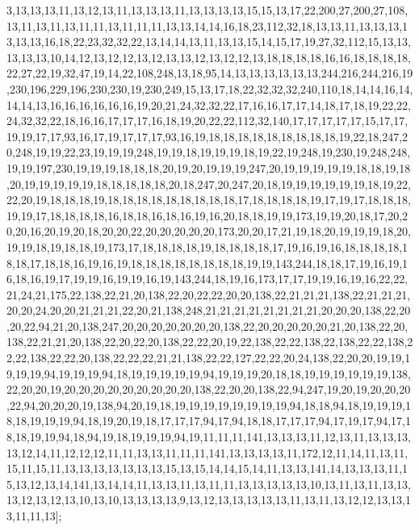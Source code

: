 3,13,13,13,11,13,12,13,11,13,13,13,11,13,13,13,13,15,15,13,17,22,200,27,200,27,108,13,11,13,11,13,11,11,13,11,11,11,13,13,14,14,16,18,23,112,32,18,13,13,11,13,13,13,13,13,13,16,18,22,23,32,32,22,13,14,14,13,11,13,13,15,14,15,17,19,27,32,112,15,13,13,13,13,13,10,14,12,13,12,12,13,12,13,13,12,13,12,12,13,18,18,18,18,16,16,18,18,18,18,22,27,22,19,32,47,19,14,22,108,248,13,18,95,14,13,13,13,13,13,13,244,216,244,216,19,230,196,229,196,230,230,19,230,249,15,13,17,18,22,32,32,32,240,110,18,14,14,16,14,14,14,13,16,16,16,16,16,16,19,20,21,24,32,32,22,17,16,16,17,17,14,18,17,18,19,22,22,24,32,32,22,18,16,16,17,17,17,16,18,19,20,22,22,112,32,140,17,17,17,17,17,15,17,17,19,19,17,17,93,16,17,19,17,17,17,93,16,19,18,18,18,18,18,18,18,18,18,19,22,18,247,20,248,19,19,22,23,19,19,19,248,19,19,18,19,19,19,18,19,22,19,248,19,230,19,248,248,19,19,197,230,19,19,19,18,18,18,20,19,20,19,19,19,247,20,19,19,19,19,19,18,18,19,18,20,19,19,19,19,19,18,18,18,18,18,20,18,247,20,247,20,18,19,19,19,19,19,19,18,19,22,22,20,19,18,18,18,19,18,18,18,18,18,18,18,18,18,17,18,18,18,18,19,17,19,17,18,18,18,19,19,17,18,18,18,18,16,18,18,16,18,16,19,16,20,18,18,19,19,173,19,19,20,18,17,20,20,20,16,20,19,20,18,20,20,22,20,20,20,20,20,173,20,20,17,21,19,18,20,19,19,19,18,20,19,19,18,19,18,18,19,173,17,18,18,18,18,19,18,18,18,18,17,19,16,19,16,18,18,18,18,18,18,17,18,18,16,19,16,19,18,18,18,18,18,18,18,18,19,19,143,244,18,18,17,19,16,19,16,18,16,19,17,19,19,16,19,19,16,19,143,244,18,19,16,173,17,17,19,19,16,19,16,22,22,21,24,21,175,22,138,22,21,20,138,22,20,22,22,20,20,138,22,21,21,21,138,22,21,21,21,20,20,24,20,20,21,21,21,22,20,21,138,248,21,21,21,21,21,21,21,21,20,20,20,138,22,20,20,22,94,21,20,138,247,20,20,20,20,20,20,20,138,22,20,20,20,20,20,21,20,138,22,20,138,22,21,21,20,138,22,20,22,20,138,22,22,20,19,22,138,22,22,138,22,138,22,22,138,22,22,138,22,22,20,138,22,22,22,21,21,138,22,22,127,22,22,20,24,138,22,20,20,19,19,19,19,19,94,19,19,19,94,18,19,19,19,19,19,94,19,19,19,20,18,18,19,19,19,19,19,19,138,22,20,20,19,20,20,20,20,20,20,20,20,20,138,22,20,20,138,22,94,247,19,20,19,20,20,20,22,94,20,20,20,19,138,94,20,19,18,19,19,19,19,19,19,19,19,94,18,18,94,18,19,19,19,18,18,19,19,19,94,18,19,20,19,18,17,17,17,94,17,94,18,18,17,17,17,94,17,19,17,94,17,18,18,19,19,94,18,94,19,18,19,19,19,94,19,11,11,11,141,13,13,13,11,12,13,11,13,13,13,13,12,14,11,12,12,12,11,11,13,13,11,11,11,141,13,13,13,13,11,172,12,11,14,11,13,11,15,11,15,11,13,13,13,13,13,13,13,15,13,15,14,14,15,14,11,13,13,141,14,13,13,13,11,15,13,12,13,14,141,13,14,14,11,13,13,11,13,11,11,13,13,13,13,13,10,13,11,13,11,13,13,13,12,13,12,13,10,13,10,13,13,13,13,9,13,12,13,13,13,13,13,11,13,11,13,12,12,13,13,13,11,11,13];

